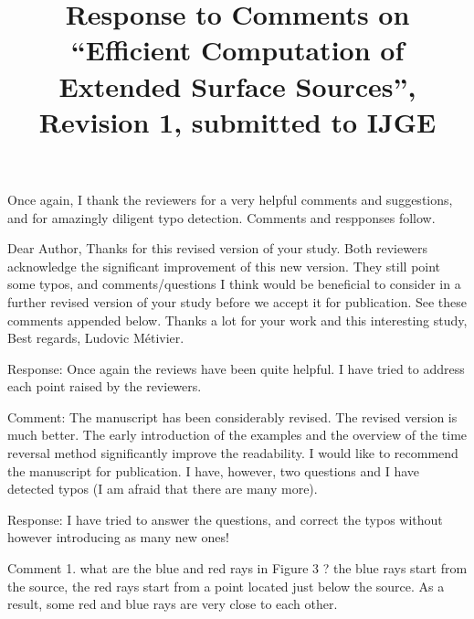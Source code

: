 \documentclass[12pt]{article}
\begin{document}
\title{Response to Comments on ``Efficient Computation of Extended Surface Sources'', Revision 1, submitted to IJGE}
\maketitle

Once again, I thank the reviewers for a very helpful comments and suggestions, and for amazingly diligent typo detection. Comments and respponses follow.


Dear Author, 
Thanks for this revised version of your  study. Both reviewers acknowledge the significant improvement of this new version. They still point some typos, and comments/questions I think would be beneficial to consider in a further revised version of your study before we accept it for publication. See these comments appended below. 
Thanks a lot for your work and this interesting study, 
Best regards,
Ludovic Métivier. 

Response: Once again the reviews have been quite helpful. I have tried to address each point raised by the reviewers.


Comment: The manuscript has been considerably revised. The revised version is much better. The early introduction of the examples and the overview of the time reversal method significantly improve the readability. I would like to recommend the manuscript for publication. 
I have, however, two questions and I have detected typos (I am afraid that there are many more).

Response: I have tried to answer the questions, and correct the typos without however introducing as many new ones!

Comment 1. what are the blue and red rays in Figure 3 ?
the blue rays start from the source, the red rays start from a point located just below the source. As a result, some red and blue rays are very close to each other.
\end{document}
